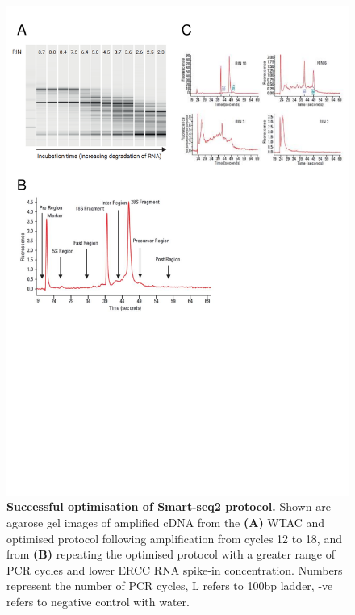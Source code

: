 \begin{figure}[!htp]
	\begin{center}
		\includegraphics[page=5,trim={0 23cm 0 0cm},clip,scale = 0.65]{Figures/General_Methodology_Figures.pdf}
	\end{center}
	\captionsetup{width=0.95\textwidth}
	\caption[Successful optimisation of Smart-seq2 protocol]%
	{\textbf{Successful optimisation of Smart-seq2 protocol.} Shown are agarose gel images of amplified cDNA from the  \textbf{(A)} WTAC and optimised protocol following amplification from cycles 12 to 18, and from \textbf{(B)} repeating the optimised protocol with a greater range of PCR cycles and lower ERCC RNA spike-in concentration. Numbers represent the number of PCR cycles, L refers to 100bp ladder, -ve refers to negative control with water.}
	\label{fig:wtac_optimised_gel1_2}
\end{figure}


